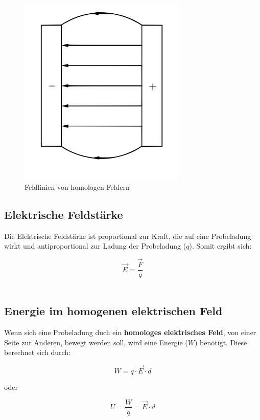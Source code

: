\documentclass[a4paper]{article}
\begin{document}
\begin{figure} [h]
	\begin{center}
		\includegraphics[width=8cm]{Bilder/homFeld.png}
		\caption{Feldlinien von homologen Feldern}
	\end{center}
\end{figure}



\subsection{Elektrische Feldstärke}
Die Elektrische Feldstärke ist proportional zur Kraft, die auf eine Probeladung wirkt und antiproportional
zur Ladung der Probeladung ($q$). Somit ergibt sich:

\Large$$\vec{E} = \dfrac{\vec{F}}{q}$$\normalsize\\



\newpage
\subsection{Energie im homogenen elektrischen Feld}
Wenn sich eine Probeladung duch ein \textbf{homologes elektrisches Feld}, von einer Seite zur Anderen,
bewegt werden soll, wird eine Energie ($W$) benötigt. Diese berechnet sich durch:

\Large$$W = q \cdot \vec{E} \cdot d$$\normalsize

\begin{center}
	\vspace{0,4cm}oder
\end{center}

\Large$$U = \dfrac{W}{q} = \vec{E} \cdot d$$\normalsize\\
\end{document}
